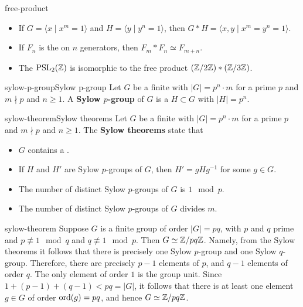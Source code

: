 \begin{example}{free-product}
    \begin{itemize}
        \item If $G = \langle x \;|\; x^m = 1 \rangle$ and $H = \langle y \;|\; y^n = 1 \rangle$, then $G * H = \langle x, y \;|\; x^m = y^n = 1 \rangle$.
        \item If $F_n$ is the  on $n$ generators, then $F_m * F_n \simeq F_{m + n}$.
        \item The  $\textup{PSL}_2(\mathbb{Z})$ is isomorphic to the free product $(\mathbb{Z}/2\mathbb{Z}) * (\mathbb{Z}/3\mathbb{Z})$.
    \end{itemize}
\end{example}

\begin{topic}{sylow-p-group}{Sylow p-group}
    Let $G$ be a finite  with $|G| = p^n \cdot m$ for a prime $p$ and $m \nmid p$ and $n \ge 1$. A \textbf{Sylow $p$-group} of $G$ is a  $H \subset G$ with $|H| = p^n$.
\end{topic}

\begin{topic}{sylow-theorem}{Sylow theorems}
    Let $G$ be a finite  with $|G| = p^n \cdot m$ for a prime $p$ and $m \nmid p$ and $n \ge 1$. The \textbf{Sylow theorems} state that
    \begin{itemize}
        \item $G$ contains a .
        \item If $H$ and $H'$ are Sylow $p$-groups of $G$, then $H' = gHg^{-1}$ for some $g \in G$.
        \item The number of distinct Sylow $p$-groups of $G$ is $1 \mod p$.
        \item The number of distinct Sylow $p$-groups of $G$ divides $m$. 
    \end{itemize}
\end{topic}

\begin{example}{sylow-theorem}
    Suppose $G$ is a finite group of order $|G| = pq$, with $p$ and $q$ prime and $p \not\equiv 1 \mod q$ and $q \not\equiv 1 \mod p$. Then $G \simeq \mathbb{Z}/pq\mathbb{Z}$. Namely, from the Sylow theorems it follows that there is precisely one Sylow $p$-group and one Sylow $q$-group. Therefore, there are precisely $p - 1$ elements of  $p$, and $q - 1$ elements of order $q$. The only element of order $1$ is the group unit. Since $1 + (p - 1) + (q - 1) < pq = |G|$, it follows that there is at least one element $g \in G$ of order $\textup{ord}(g) = pq$, and hence $G \simeq \mathbb{Z}/pq\mathbb{Z}$.
\end{example}

